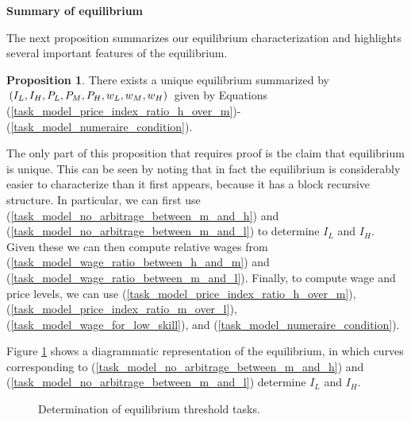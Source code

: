 \documentclass[12pt]{article}
\theoremstyle{definition}
\newtheorem{proposition}{Proposition}
\begin{document}
{\bf Summary of equilibrium}

The next proposition summarizes our equilibrium characterization and highlights several important features of the equilibrium.
\begin{proposition}
    \label{task_model_prop1}
	There exists a unique equilibrium summarized by $\left( I_L, I_H, P_L, P_M, P_H, w_L, w_M, w_H \right)$ given by Equations (\ref{task_model_price_index_ratio_h_over_m})-(\ref{task_model_numeraire_condition}).
\end{proposition}

The only part of this proposition that requires proof is the claim that equilibrium is unique. This can be seen by noting that in fact the equilibrium is considerably easier to characterize than it first appears, because it has a block recursive structure. In particular, we can first use (\ref{task_model_no_arbitrage_between_m_and_h}) and (\ref{task_model_no_arbitrage_between_m_and_l}) to determine $I_L$ and $I_H$. Given these we can then compute relative wages from (\ref{task_model_wage_ratio_between_h_and_m}) and (\ref{task_model_wage_ratio_between_m_and_l}). Finally, to compute wage and price levels, we can use (\ref{task_model_price_index_ratio_h_over_m}), (\ref{task_model_price_index_ratio_m_over_l}), (\ref{task_model_wage_for_low_skill}), and (\ref{task_model_numeraire_condition}).

Figure \ref{fig_equilibrium} shows a diagrammatic representation of the equilibrium, in which curves corresponding to (\ref{task_model_no_arbitrage_between_m_and_h}) and (\ref{task_model_no_arbitrage_between_m_and_l}) determine $I_L$ and $I_H$.

\begin{figure}[H]
    \noindent\caption{Determination of equilibrium threshold tasks.}
    \begin{center}
        \label{fig_equilibrium}
    \end{center}
\end{figure}
\end{document}
